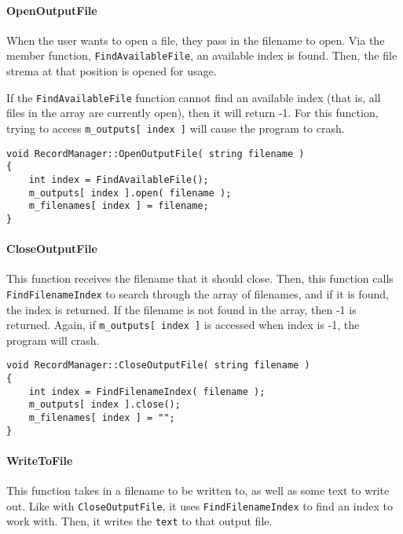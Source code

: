 \documentclass[a4paper,12pt]{book}
\begin{document}
            \paragraph{OpenOutputFile}
            When the user wants to open a file, they pass in the filename
            to open. Via the member function, \texttt{FindAvailableFile},
            an available index is found. Then, the file strema at that
            position is opened for usage.

            If the \texttt{FindAvailableFile} function cannot find
            an available index (that is, all files in the array are
            currently open), then it will return -1. For this function,
            trying to access \texttt{m\_outputs[ index ]} will cause
            the program to crash.
            
\begin{lstlisting}[style=code]
void RecordManager::OpenOutputFile( string filename )
{
    int index = FindAvailableFile();
    m_outputs[ index ].open( filename );
    m_filenames[ index ] = filename;
}
\end{lstlisting}

            \paragraph{CloseOutputFile}
            This function receives the filename that it should close.
            Then, this function calls \texttt{FindFilenameIndex} to
            search through the array of filenames, and if it is found,
            the index is returned. If the filename is not found in the array,
            then -1 is returned. Again, if \texttt{m\_outputs[ index ]}
            is accessed when index is -1, the program will crash.

\newpage
\begin{lstlisting}[style=code]
void RecordManager::CloseOutputFile( string filename )
{
    int index = FindFilenameIndex( filename );
    m_outputs[ index ].close();
    m_filenames[ index ] = "";
}
\end{lstlisting}

            \paragraph{WriteToFile}
            This function takes in a filename to be written to,
            as well as some text to write out. Like with \texttt{CloseOutputFile},
            it uses \texttt{FindFilenameIndex} to find an index to work with.
            Then, it writes the \texttt{text} to that output file.
            
\end{document}
